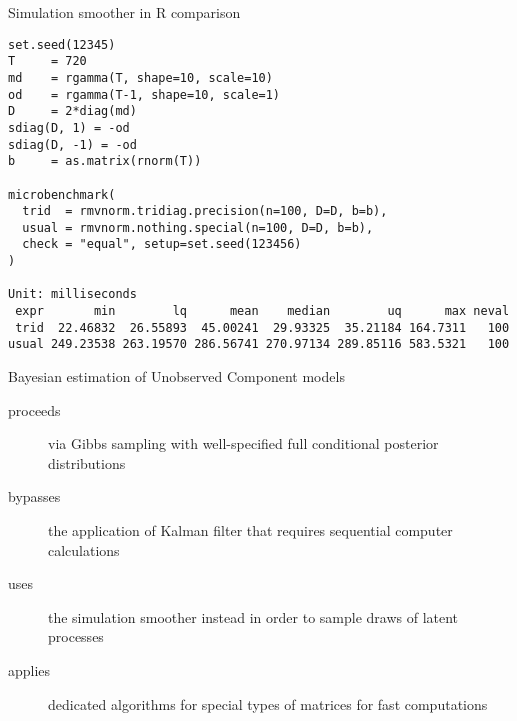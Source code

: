 \documentclass[notes,blackandwhite,mathsans,usenames,dvipsnames]{beamer}
\begin{document}
\begin{frame}[fragile]{Simulation smoother in R {\color{purple}comparison}}

\footnotesize
\begin{verbatim}
set.seed(12345)
T     = 720
md    = rgamma(T, shape=10, scale=10)
od    = rgamma(T-1, shape=10, scale=1)
D     = 2*diag(md)
sdiag(D, 1) = -od
sdiag(D, -1) = -od
b     = as.matrix(rnorm(T))

microbenchmark(
  trid  = rmvnorm.tridiag.precision(n=100, D=D, b=b),
  usual = rmvnorm.nothing.special(n=100, D=D, b=b),
  check = "equal", setup=set.seed(123456)
)

Unit: milliseconds
 expr       min        lq      mean    median        uq      max neval
 trid  22.46832  26.55893  45.00241  29.93325  35.21184 164.7311   100
usual 249.23538 263.19570 286.56741 270.97134 289.85116 583.5321   100
\end{verbatim}

\end{frame}













{
\begin{frame}{Bayesian estimation of Unobserved Component models}

\begin{description}
\item[proceeds] {\color{mcxs2}via Gibbs sampling with well-specified full conditional posterior distributions} 

\bigskip\item[bypasses] {\color{mcxs2}the application of Kalman filter that requires sequential computer calculations} 

\bigskip\item[uses] {\color{mcxs2}the simulation smoother instead in order to sample draws of latent processes} 

\bigskip\item[applies] {\color{mcxs2}dedicated algorithms for special types of matrices for fast computations} 

\end{description}

\end{frame}}
\end{document}
